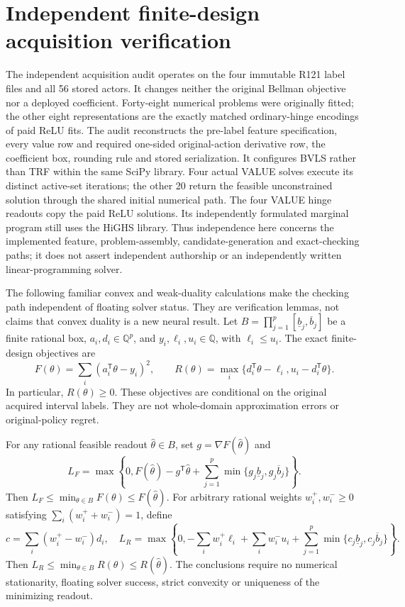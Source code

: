 \section{Independent finite-design acquisition verification}
\label{sec:independentfit126}

The independent acquisition audit operates on the four immutable R121 label
files and all 56 stored actors.  It changes neither the original Bellman
objective nor a deployed coefficient.  Forty-eight numerical problems were
originally fitted; the other eight representations are the exactly matched
ordinary-hinge encodings of paid ReLU fits.  The audit reconstructs the
pre-label feature specification, every value row and required one-sided
original-action derivative row, the coefficient box, rounding rule and stored
serialization.  It configures BVLS rather than TRF within the same SciPy
library.  Four actual VALUE solves execute its distinct active-set iterations;
the other 20 return the feasible unconstrained solution through the shared
initial numerical path.  The four VALUE hinge readouts copy the paid ReLU
solutions.  Its independently formulated marginal
program still uses the HiGHS library.  Thus independence here concerns the
implemented feature, problem-assembly, candidate-generation and exact-checking
paths; it does not assert independent authorship or an independently written
linear-programming solver.

The following familiar convex and weak-duality calculations make the checking
path independent of floating solver status.  They are verification lemmas, not
claims that convex duality is a new neural result.  Let
$B=\prod_{j=1}^p[\underline b_j,\overline b_j]$ be a finite rational box,
$a_i,d_i\in\mathbb Q^p$, and $y_i,\ell_i,u_i\in\mathbb Q$, with
$\ell_i\leq u_i$.  The exact finite-design objectives are
\begin{equation}
 F(\theta)=\sum_i(a_i^{\mathsf T}\theta-y_i)^2,
 \qquad
 R(\theta)=\max_i\{d_i^{\mathsf T}\theta-\ell_i,
                         u_i-d_i^{\mathsf T}\theta\}.
\end{equation}
In particular, $R(\theta)\geq0$.  These objectives are conditional on the
original acquired interval labels.  They are not whole-domain approximation
errors or original-policy regret.

\begin{proposition}
\label{prop:finitefit126}
For any rational feasible readout $\widehat\theta\in B$, set
$g=\nabla F(\widehat\theta)$ and
\[
 L_F=\max\!\left\{0,F(\widehat\theta)-g^{\mathsf T}\widehat\theta
       +\sum_{j=1}^p\min\{g_j\underline b_j,g_j\overline b_j\}\right\}.
\]
Then $L_F\leq\min_{\theta\in B}F(\theta)\leq F(\widehat\theta)$.
For arbitrary rational weights $w_i^+,w_i^-\geq0$ satisfying
$\sum_i(w_i^++w_i^-)=1$, define
\[
 c=\sum_i(w_i^+-w_i^-)d_i,
 \quad
 L_R=\max\!\left\{0,-\sum_iw_i^+\ell_i+\sum_iw_i^-u_i
        +\sum_{j=1}^p\min\{c_j\underline b_j,c_j\overline b_j\}\right\}.
\]
Then $L_R\leq\min_{\theta\in B}R(\theta)\leq R(\widehat\theta)$.
The conclusions require no numerical stationarity, floating solver success,
strict convexity or uniqueness of the minimizing readout.
\end{proposition}

